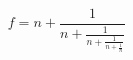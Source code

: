 \documentclass[a4paper,10pt]{article}
\title{}
\author{}
\begin{document}
$$  f =  n + \frac{1}{n + \frac{1}{ n + \frac{1}{ n + \frac{1}{ n }} } } $$
\end{document}
